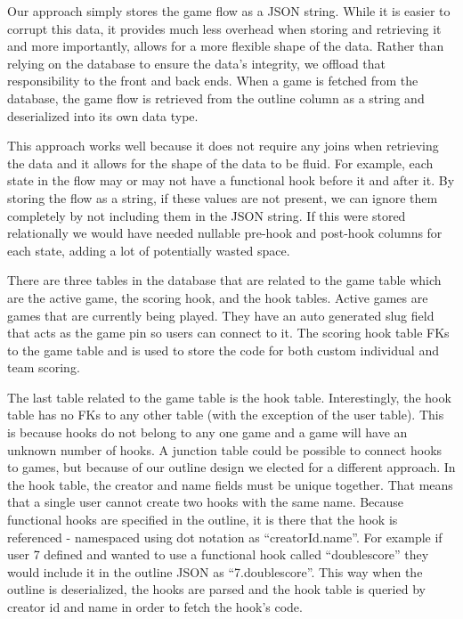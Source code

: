 \documentclass{article}
\begin{document}
    		Our approach simply stores the game flow as a JSON string. While it is easier to corrupt this data, it provides much less overhead when storing and retrieving it and more importantly, allows for a more flexible shape of the data. Rather than relying on the database to ensure the data's integrity, we offload that responsibility to the front and back ends. When a game is fetched from the database, the game flow is retrieved from the outline column as a string and deserialized into its own data type.
    		\smallskip
    		
    		This approach works well because it does not require any joins when retrieving the data and it allows for the shape of the data to be fluid. For example, each state in the flow may or may not have a functional hook before it and after it. By storing the flow as a string, if these values are not present, we can ignore them completely by not including them in the JSON string. If this were stored relationally we would have needed nullable pre-hook and post-hook columns for each state, adding a lot of potentially wasted space.
    		\smallskip
    		
    		There are three tables in the database that are related to the game table which are the active game, the scoring hook, and the hook tables. Active games are games that are currently being played. They have an auto generated slug field that acts as the game pin so users can connect to it. The scoring hook table FKs to the game table and is used to store the code for both custom individual and team scoring.
    		\smallskip
    		
    		The last table related to the game table is the hook table. Interestingly, the hook table has no FKs to any other table (with the exception of the user table). This is because hooks do not belong to any one game and a game will have an unknown number of hooks. A junction table could be possible to connect hooks to games, but because of our outline design we elected for a different approach. In the hook table, the creator and name fields must be unique together. That means that a single user cannot create two hooks with the same name. Because functional hooks are specified in the outline, it is there that the hook is referenced - namespaced using dot notation as ``creatorId.name''. For example if user 7 defined and wanted to use a functional hook called ``doublescore'' they would include it in the outline JSON as ``7.doublescore''. This way when the outline is deserialized, the hooks are parsed and the hook table is queried by creator id and name in order to fetch the hook's code.
    		
\end{document}
